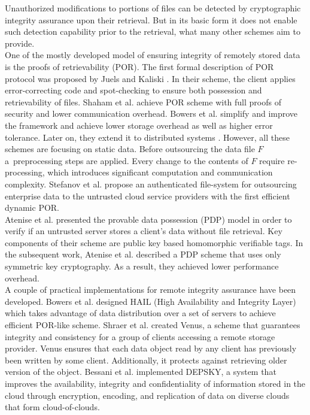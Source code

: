 Unauthorized modifications to portions of files can be detected by
cryptographic integrity assurance upon their retrieval. But in its basic form
it does not enable such detection capability prior to the retrieval, what many
other schemes aim to provide.\\

One of the mostly developed model of ensuring integrity of remotely stored data
is the proofs of retrievability (POR). The first formal description of POR
protocol was proposed by Juels and Kaliski \cite{por}. In their scheme,
the client applies error-correcting code and spot-checking to ensure both
possession and retrievability of files. Shaham et al. \cite{compact-por}
achieve POR scheme with full proofs of security and lower communication
overhead. Bowers et al. \cite{por2} simplify and improve the framework and
achieve lower storage overhead as well as higher error tolerance. Later on, 
they extend it to distributed systems \cite{hail}. However, all these schemes
are focusing on static data. Before outsourcing the data file $F$ 
a~preprocessing steps are applied. Every change to the contents of $F$ require
re-processing, which introduces significant computation and communication
complexity. Stefanov et al. \cite{iris} propose an authenticated file-system
for outsourcing enterprise data to the untrusted cloud service providers with
the first efficient dynamic POR.\\

Atenise et al. \cite{pdp} presented the provable data possession (PDP) model
in order to verify if an untrusted server stores a client's data without file
retrieval. Key components of their scheme are public key based homomorphic
verifiable tags. In the subsequent work, Atenise et al. \cite{pdp2} described
a PDP scheme that uses only symmetric key cryptography. As a result, they
achieved lower performance overhead.\\

A couple of practical implementations for remote integrity assurance have been
developed. Bowers et al. \cite{hail} designed HAIL (High Availability and
Integrity Layer) which takes advantage of data distribution over a set of
servers to achieve efficient POR-like scheme. Shraer et al. \cite{venus}
created Venus, a scheme that guarantees integrity and consistency for a group
of clients accessing a remote storage provider. Venus ensures that each data
object read by any client has previously been written by some client.
Additionally, it protects against retrieving older version of the object.
Bessani et al. \cite{depsky} implemented DEPSKY, a system that improves the
availability, integrity and confidentiality of information stored in the cloud
through encryption, encoding, and replication of data on diverse clouds that
form cloud-of-clouds.\\

